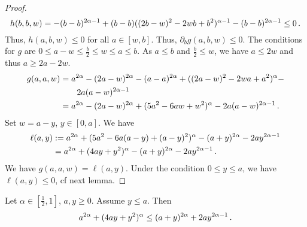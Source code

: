 \begin{proof}
	\begin{equation*}
		h(b,b,w) =-(b-b)^{2\alpha-1}+(b-b)((2b-w)^2 - 2 w b + b^2)^{\alpha-1} -  (b-b)^{2\alpha-1} \leq 0
		\, .
	\end{equation*}
	Thus, $h(a,b,w) \leq 0$ for all $a \in [w,b]$.
	Thus, $\partial_b g(a,b,w) \leq 0$.
	The conditions for $g$ are $0 \leq a-w \leq \frac b2 \leq w \leq a \leq b$.
	As $a \leq b$ and $\frac b2 \leq w$, we have $a \leq 2 w$ and thus $a \geq 2a-2w$.
	\begin{align*}
		g(a,a,w) 
		&= a^{2\alpha}-(2a-w)^{2\alpha}-(a-a)^{2\alpha}+((2a-w)^2 - 2 w a + a^2)^\alpha -
		\\&\qquad 2 a (a-w)^{2\alpha-1}
		\\&=
		a^{2\alpha}-(2a-w)^{2\alpha}+(5 a^2 - 6 a w + w^2)^\alpha - 2 a (a-w)^{2\alpha-1}
		\, .
	\end{align*}
	Set $w = a - y$, $y\in[0,a]$. We have
	\begin{align*}
		\ell(a,y) &:= a^{2\alpha}+(5 a^2 - 6 a (a-y) + (a-y)^2)^\alpha - (a+y)^{2\alpha} - 2 a y^{2\alpha-1}
		\\&= 
		a^{2\alpha}+(4 a y + y^2)^\alpha - (a+y)^{2\alpha} - 2 a y^{2\alpha-1}
		\, .
	\end{align*}
	We have $g(a,a,w) = \ell(a,y)$.
	Under the condition $0 \leq y \leq a$, we have $\ell(a,y) \leq 0$, cf next lemma.
\end{proof}
%
\begin{lemma}
		Let $\alpha\in[\frac12, 1]$, $a,y\geq0$.
		Assume $y \leq a$.
		Then
		\begin{equation*}
			a^{2\alpha} + (4 a y + y^2)^\alpha 
			\leq
			(a+y)^{2\alpha} + 2 a y^{2\alpha-1}
			\, .
		\end{equation*}
\end{lemma}
%
